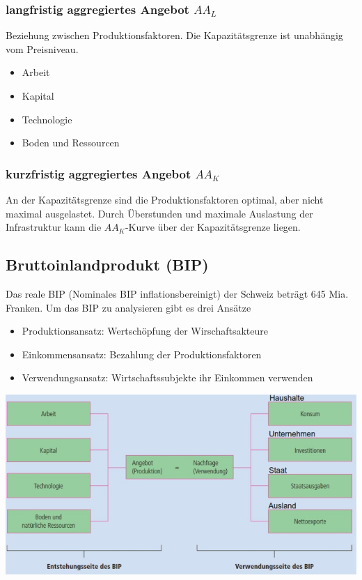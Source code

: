 	\subsubsection{langfristig aggregiertes Angebot $AA_L$}
	Beziehung zwischen Produktionsfaktoren. Die Kapazitätsgrenze ist unabhängig vom Preisniveau.
	\begin{itemize}
		\item Arbeit
		\item Kapital
		\item Technologie
		\item Boden und Ressourcen
	\end{itemize}
	\subsubsection{kurzfristig aggregiertes Angebot $AA_K$}
	An der Kapazitätsgrenze sind die Produktionsfaktoren optimal, aber nicht maximal ausgelastet. Durch Überstunden und maximale Auslastung der Infrastruktur kann die $AA_K$-Kurve über der Kapazitätsgrenze liegen.
\subsection{Bruttoinlandprodukt (BIP)}
Das reale BIP (Nominales BIP inflationsbereinigt) der Schweiz beträgt 645 Mia. Franken. Um das BIP zu analysieren gibt es drei Ansätze
\begin{itemize}
	\item Produktionsansatz: Wertschöpfung der Wirschaftsakteure
	\item Einkommensansatz: Bezahlung der Produktionsfaktoren
	\item Verwendungsansatz: Wirtschaftssubjekte ihr Einkommen verwenden
\end{itemize}
\includegraphics[width=0.9\linewidth]{images/bip.jpg}
\clearpage
\pagebreak